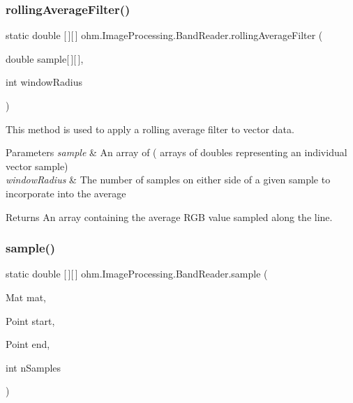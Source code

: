 \subsubsection{\texorpdfstring{rolling\+Average\+Filter()}{rollingAverageFilter()}}
{\footnotesize\ttfamily static double \mbox{[}$\,$\mbox{]}\mbox{[}$\,$\mbox{]} ohm.\+Image\+Processing.\+Band\+Reader.\+rolling\+Average\+Filter (\begin{DoxyParamCaption}\item[{double}]{sample\mbox{[}$\,$\mbox{]}\mbox{[}$\,$\mbox{]},  }\item[{int}]{window\+Radius }\end{DoxyParamCaption})\hspace{0.3cm}{\ttfamily [static]}}

This method is used to apply a rolling average filter to vector data. 
\begin{DoxyParams}{Parameters}
{\em sample} & An array of ( arrays of doubles representing an individual vector sample) \\
\hline
{\em window\+Radius} & The number of samples on either side of a given sample to incorporate into the average \\
\hline
\end{DoxyParams}
\begin{DoxyReturn}{Returns}
An array containing the average R\+GB value sampled along the line. 
\end{DoxyReturn}
\hypertarget{classohm_1_1_image_processing_1_1_band_reader_a19841f2d731de48d3e4b1f0b2cbe2ee8}{}\label{classohm_1_1_image_processing_1_1_band_reader_a19841f2d731de48d3e4b1f0b2cbe2ee8} 
\subsubsection{\texorpdfstring{sample()}{sample()}}
{\footnotesize\ttfamily static double \mbox{[}$\,$\mbox{]}\mbox{[}$\,$\mbox{]} ohm.\+Image\+Processing.\+Band\+Reader.\+sample (\begin{DoxyParamCaption}\item[{Mat}]{mat,  }\item[{Point}]{start,  }\item[{Point}]{end,  }\item[{int}]{n\+Samples }\end{DoxyParamCaption})\hspace{0.3cm}{\ttfamily [static]}}

